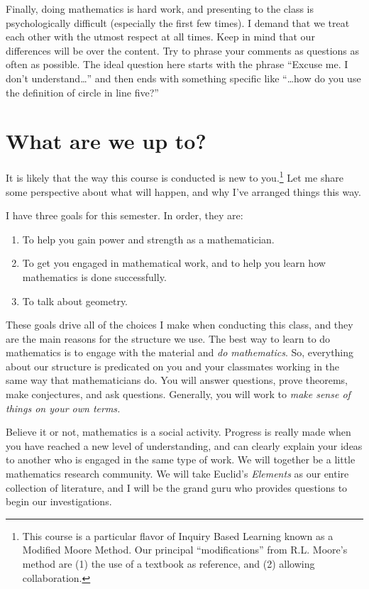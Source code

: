 Finally, doing mathematics is hard work, and presenting to the class is psychologically difficult (especially the first few times).
I demand that we treat each other with the utmost respect at all times.
Keep in mind that our differences will be over the content.
Try to phrase your comments as questions as often as possible.
The ideal question here starts with the phrase ``Excuse me. I don't understand\dots'' and then ends with something specific like ``\dots how do you use the definition of circle in line five?''


\section*{What are we up to?}

It is likely that the way this course is conducted is new to you.\footnote{This course is a particular flavor of Inquiry Based Learning known as a Modified Moore Method. Our principal ``modifications'' from R.L. Moore's method are (1) the use of a textbook as reference, and (2) allowing collaboration.}
Let me share some perspective about what will happen, and why I've arranged things this way.


I have three goals for this semester. In order, they are:
\begin{enumerate}
\item To help you gain power and strength as a mathematician.

\item To get you engaged in mathematical work, and to help you learn how mathematics is done successfully.

\item To talk about geometry.
\end{enumerate}

These goals drive all of the choices I make when conducting this class, and they are the main reasons for the structure we use.
The best way to learn to do mathematics is to engage with the material and \emph{do mathematics}.
So, everything about our structure is predicated on you and your classmates working in the same way that mathematicians do.
You will answer questions, prove theorems, make conjectures, and ask questions.
Generally, you will work to \emph{make sense of things on your own terms.}

Believe it or not, mathematics is a social activity.
Progress is really made when you have reached a new level of understanding, and can clearly explain your ideas to another who is engaged in the same type of work.
We will together be a little mathematics research community.
We will take Euclid's \emph{Elements} as our entire collection of literature, and I will be the grand guru who provides questions to begin our investigations.

